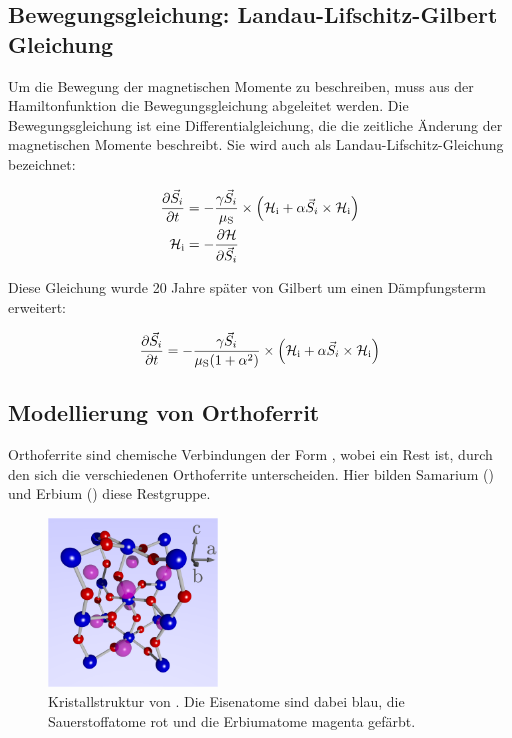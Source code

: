 \documentclass[main.tex]{subfiles}
\begin{document}
\subsection{Bewegungsgleichung: Landau-Lifschitz-Gilbert Gleichung}
Um die Bewegung der magnetischen Momente zu beschreiben, muss aus der
Hamiltonfunktion die Bewegungsgleichung abgeleitet werden. Die
Bewegungsgleichung ist eine Differentialgleichung, die die zeitliche Änderung
der magnetischen Momente beschreibt. Sie wird auch als
Landau-Lifschitz-Gleichung bezeichnet:

\begin{align}
	\pdv{\vec{S}_i}{t}     & = -\frac{\gamma \vec{S}_i}{\mu_{\text{S}}}
	\times
	\qty(\mathcal{H}_{\text{i}} + \alpha \vec{S}_i \times
	\mathcal{H}_{\text{i}})
	\\
	\mathcal{H}_{\text{i}} & = - \pdv{\mathcal{H}}{\vec{S}_i}
\end{align}\cite{landau-lifshitz}

Diese Gleichung wurde 20 Jahre später von Gilbert um einen Dämpfungsterm
erweitert:

\begin{align}
	\pdv{\vec{S}_i}{t} = -\frac{\gamma
		\vec{S}_i}{\mu_{\text{S}}(1+\alpha^2)}
	\times
	\qty(\mathcal{H}_{\text{i}} + \alpha \vec{S}_i \times
	\mathcal{H}_{\text{i}})
\end{align}\cite{Gilbert-damping}

\subsection{Modellierung von Orthoferrit}

Orthoferrite sind chemische Verbindungen der Form , wobei  ein
Rest ist, durch den sich die verschiedenen Orthoferrite unterscheiden. Hier
bilden Samarium () und Erbium () diese Restgruppe.

\begin{figure}[H]
	\centering

	\includegraphics[width=0.4\textwidth]{bilder/jschlege/UnitCell_labeled.png}
	\caption{Kristallstruktur von
		. Die Eisenatome sind dabei blau, die
		Sauerstoffatome rot und die Erbiumatome magenta gefärbt.
		\cite{schlegel-master}}
	\label{fig:orthoferrit}
\end{figure}
\end{document}
